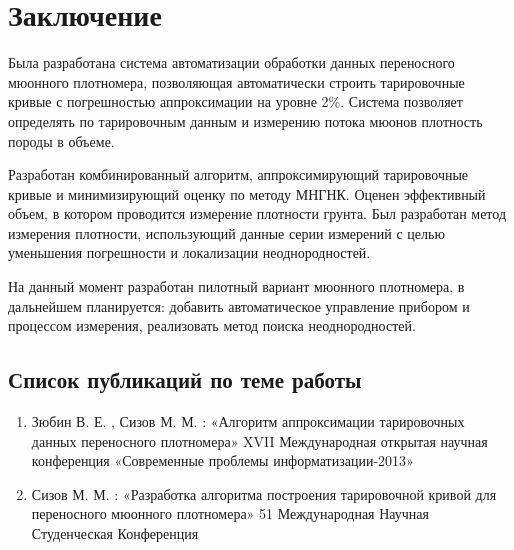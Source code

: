 \chapter*{Заключение}						%

Была разработана система автоматизации обработки данных переносного мюонного плотномера, позволяющая автоматически строить тарировочные кривые с
погрешностью аппроксимации на уровне 2\%. Система позволяет определять по тарировочным данным и измерению потока мюонов 
плотность породы в объеме. 

Разработан комбинированный алгоритм, аппроксимирующий тарировочные кривые и минимизирующий оценку по методу МНГНК. Оценен эффективный объем, в котором проводится измерение плотности грунта. Был разработан 
метод измерения плотности, использующий данные серии измерений с целью уменьшения погрешности и локализации 
неоднородностей.

На данный момент разработан пилотный вариант мюонного плотномера, в дальнейшем планируется: добавить автоматическое 
управление прибором и процессом измерения, реализовать метод поиска неоднородностей.

\section*{Список публикаций по теме работы}						%

\begin{enumerate}

\item Зюбин В. Е. , Сизов М. М. : «Алгоритм аппроксимации тарировочных данных переносного плотномера» XVII Международная открытая научная конференция «Современные проблемы информатизации-2013»

\item Сизов М. М. : «Разработка алгоритма построения тарировочной кривой для переносного мюонного плотномера» 51 Международная Научная Студенческая Конференция 
\end{enumerate}

\clearpage